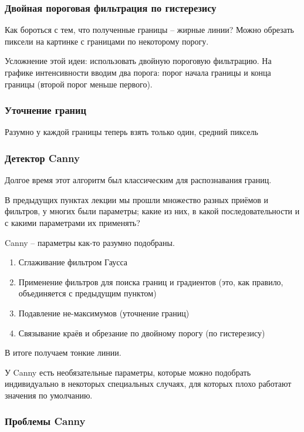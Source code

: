 \documentclass[main.tex]{subfiles}
\begin{document}
\subsubsection{Двойная пороговая фильтрация по гистерезису}

Как бороться с тем, что полученные границы -- жирные линии?
Можно обрезать пиксели на картинке с границами по некоторому порогу.

Усложнение этой идеи: использовать двойную пороговую фильтрацию.
На графике интенсивности вводим два порога: порог начала границы и конца границы (второй порог меньше первого).

\subsubsection{Уточнение границ}

Разумно у каждой границы теперь взять только один, средний пиксель

\subsubsection{Детектор Canny}

Долгое время этот алгоритм был классическим для распознавания границ.

В предыдущих пунктах лекции мы прошли множество разных приёмов и фильтров, у многих были параметры; какие из них, в какой последовательности и с какими параметрами их применять?

Canny -- параметры как-то разумно подобраны.

\begin{enumerate}[noitemsep]
	\item Сглаживание фильтром Гаусса
	\item Применение фильтров для поиска границ и градиентов (это, как правило, объединяется с предыдущим пунктом)
	\item Подавление не-максимумов (уточнение границ)
	\item Связывание краёв и обрезание по двойному порогу (по гистерезису)
\end{enumerate}

В итоге получаем тонкие линии.

У Canny есть необязательные параметры, которые можно подобрать индивидуально в некоторых специальных случаях, для которых плохо работают значения по умолчанию.

\subsubsection{Проблемы Canny}
\end{document}
